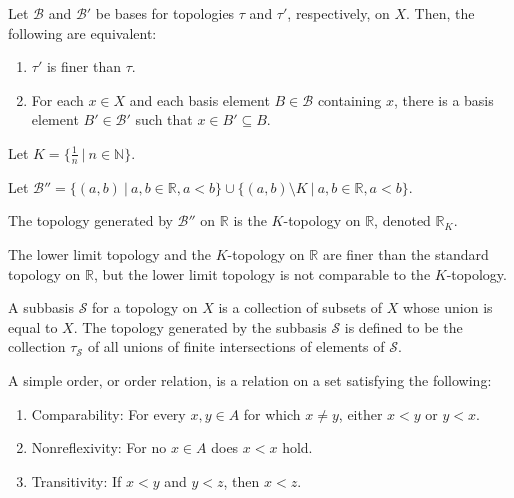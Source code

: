 \documentclass{article}
\newcommand{\R}{\mathbb R}
\begin{document}
\medskip{}

    Let $\mathcal B$ and $\mathcal B'$ be bases for topologies $\tau$ and $\tau'$, respectively, on $X$. Then, the following are equivalent:

    \begin{enumerate}
        \item $\tau'$ is finer than $\tau$.
        \item For each $x \in X$ and each basis element $B \in \mathcal B$ containing $x$, there is a basis element $B' \in \mathcal B'$ such that $x \in B' \subseteq B$.
    \end{enumerate}

\medskip{}

    Let $K = \{\frac1n~|~n\in\mathbb N\}$.

    Let $\mathcal B'' = \{(a,b)~|~a,b\in \mathbb R,a<b\} \cup \{(a,b)\setminus K~|~a,b\in\mathbb R,a<b\}.$

    The topology generated by $\mathcal B''$ on $\mathbb R$ is the $K$-topology on $\mathbb R$, denoted $\R_K$.

\medskip{}

    The lower limit topology and the $K$-topology on $\mathbb R$ are finer than the standard topology on $\mathbb R$, but the lower limit topology is not comparable to the $K$-topology.

\medskip{}

A subbasis $\mathcal S$ for a topology on $X$ is a collection of subsets of $X$ whose union is equal to $X$. The topology generated by the subbasis $\mathcal S$ is defined to be the collection $\tau_{\mathcal S}$ of all unions of finite intersections of elements of $\mathcal S$.

\medskip{}

    A simple order, or order relation, is a relation on a set satisfying the following:
    \begin{enumerate}
        \item Comparability: For every $x,y \in A$ for which $x \neq y$, either $x < y$ or $y < x$.
        \item Nonreflexivity: For no $x \in A$ does $x < x$ hold.
        \item Transitivity: If $x<y$ and $y<z$, then $x<z$.
    \end{enumerate}

\medskip{}
\end{document}
